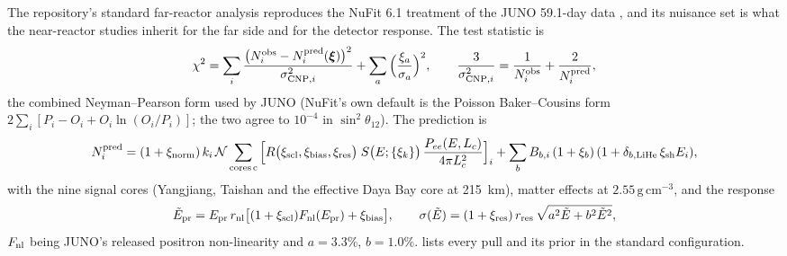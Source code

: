 \documentclass[aps,prd,superscriptaddress,nofootinbib,longbibliography,notitlepage,11pt]{revtex4-2}
\begin{document}
The repository's standard far-reactor analysis reproduces the NuFit 6.1 treatment of the
JUNO 59.1-day data \cite{JUNO:2025gmd}, and its nuisance set is what the near-reactor
studies inherit for the far side and for the detector response.  The test statistic is
\begin{equation}
\chi^2=\sum_i\frac{\big(N^{\rm obs}_i-N^{\rm pred}_i(\bm\xi)\big)^2}{\sigma^2_{{\rm CNP},i}}
+\sum_a\Big(\frac{\xi_a}{\sigma_a}\Big)^2,\qquad
\frac{3}{\sigma^2_{{\rm CNP},i}}=\frac{1}{N^{\rm obs}_i}+\frac{2}{N^{\rm pred}_i},
\label{eq:chi2}
\end{equation}
the combined Neyman--Pearson form used by JUNO (NuFit's own default is the Poisson
Baker--Cousins form $2\sum_i[P_i-O_i+O_i\ln(O_i/P_i)]$; the two agree to $10^{-4}$ in
$\sin^2\theta_{12}$).  The prediction is
\begin{equation}
N^{\rm pred}_i=(1+\xi_{\rm norm})\,k_i\,\mathcal N\sum_{\rm cores\,c}\Big[R\big(\xi_{\rm scl},\xi_{\rm bias},\xi_{\rm res}\big)\;
S\big(E;\{\xi_k\}\big)\,\frac{P_{ee}(E,L_c)}{4\pi L_c^2}\Big]_i+\sum_bB_{b,i}\,(1+\xi_b)\,(1+\delta_{b,{\rm LiHe}}\,\xi_{\rm sh}E_i),
\label{eq:pred}
\end{equation}
with the nine signal cores (Yangjiang, Taishan and the effective Daya Bay core at 215~km),
matter effects at $2.55\,\mathrm{g\,cm^{-3}}$, and the response
\begin{equation}
\tilde E_{\rm pr}=E_{\rm pr}\,r_{\rm nl}\big[(1+\xi_{\rm scl})F_{\rm nl}(E_{\rm pr})+\xi_{\rm bias}\big],\qquad
\sigma(\tilde E)=(1+\xi_{\rm res})\,r_{\rm res}\,\sqrt{a^2\tilde E+b^2\tilde E^2},
\label{eq:response}
\end{equation}
$F_{\rm nl}$ being JUNO's released positron non-linearity and $a=3.3\%$, $b=1.0\%$.
 lists every pull and its prior in the standard configuration.
\end{document}
